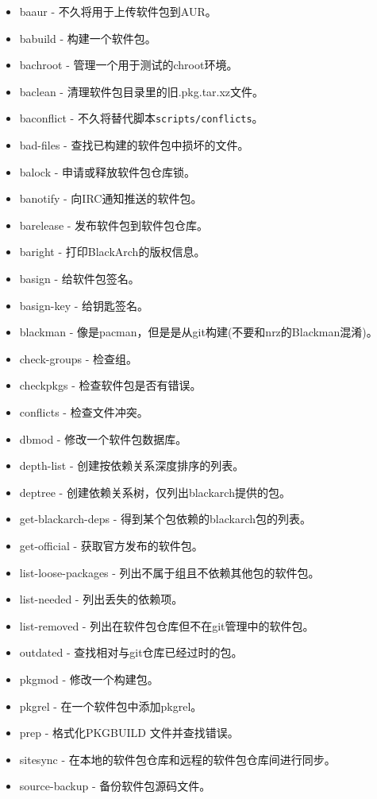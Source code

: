 \documentclass[a4paper, oneside, 11pt]{book}
\begin{document}
\begin{itemize}
\item baaur - 不久将用于上传软件包到AUR。
\item babuild - 构建一个软件包。
\item bachroot - 管理一个用于测试的chroot环境。
\item baclean - 清理软件包目录里的旧.pkg.tar.xz文件。
\item baconflict - 不久将替代脚本\verb|scripts/conflicts|。
\item bad-files - 查找已构建的软件包中损坏的文件。
\item balock - 申请或释放软件包仓库锁。
\item banotify - 向IRC通知推送的软件包。
\item barelease - 发布软件包到软件包仓库。
\item baright - 打印BlackArch的版权信息。
\item basign - 给软件包签名。
\item basign-key - 给钥匙签名。
\item blackman - 像是pacman，但是是从git构建(不要和nrz的Blackman混淆)。
\item check-groups - 检查组。
\item checkpkgs - 检查软件包是否有错误。
\item conflicts - 检查文件冲突。
\item dbmod - 修改一个软件包数据库。
\item depth-list - 创建按依赖关系深度排序的列表。
\item deptree - 创建依赖关系树，仅列出blackarch提供的包。
\item get-blackarch-deps - 得到某个包依赖的blackarch包的列表。
\item get-official - 获取官方发布的软件包。
\item list-loose-packages - 列出不属于组且不依赖其他包的软件包。
\item list-needed - 列出丢失的依赖项。
\item list-removed - 列出在软件包仓库但不在git管理中的软件包。
\item outdated - 查找相对与git仓库已经过时的包。
\item pkgmod - 修改一个构建包。
\item pkgrel - 在一个软件包中添加pkgrel。
\item prep - 格式化PKGBUILD 文件并查找错误。
\item sitesync - 在本地的软件包仓库和远程的软件包仓库间进行同步。
\item source-backup - 备份软件包源码文件。
\end{itemize}
\end{document}
